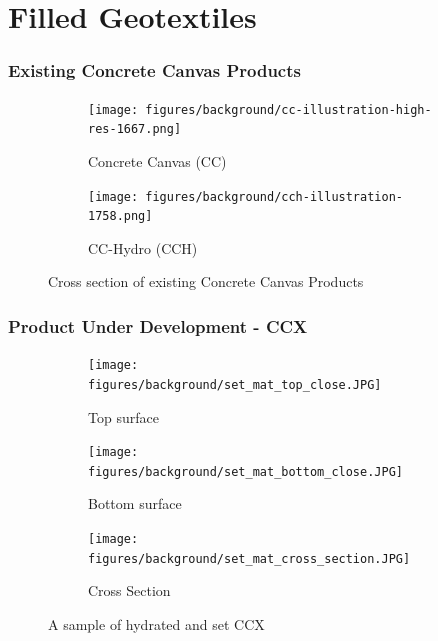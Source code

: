 \documentclass[12pt]{report}
\begin{document}
    \pagebreak
    \section{Filled Geotextiles}
    
    
    \subsubsection{Existing Concrete Canvas Products}
    \begin{figure}[ht]
    \begin{subfigure}{.5\textwidth}
        \centering
        \texttt{[image: figures/background/cc-illustration-high-res-1667.png]}  
        \caption{Concrete Canvas (CC)}
        \label{fig:sub-first}
    \end{subfigure}
    \begin{subfigure}{.5\textwidth}
        \centering
        \texttt{[image: figures/background/cch-illustration-1758.png]}  
        \caption{CC-Hydro (CCH)}
        \label{fig:sub-second}
    \end{subfigure}
    \caption{Cross section of existing Concrete Canvas Products}
    \label{fig:fig}
    \end{figure}

    \subsubsection{Product Under Development - CCX}
    \begin{figure}[ht]
    \begin{subfigure}{.5\textwidth}
        \centering
        \texttt{[image: figures/background/set\_mat\_top\_close.JPG]}  
        \caption{Top surface}
        \label{fig:ccx_set_top}
    \end{subfigure}
    \begin{subfigure}{.5\textwidth}
        \centering
        \texttt{[image: figures/background/set\_mat\_bottom\_close.JPG]}  
        \caption{Bottom surface}
        \label{fig:ccx_set_bottom}
    \end{subfigure}
    \newline
    \begin{subfigure}{\textwidth}
        \centering
        \texttt{[image: figures/background/set\_mat\_cross\_section.JPG]}  
        \caption{Cross Section}
        \label{fig:ccx_set_cross}
    \end{subfigure}
    \caption{A sample of hydrated and set CCX}
    \label{fig:ccx_set_sample}
    \end{figure}
    
\end{document}
